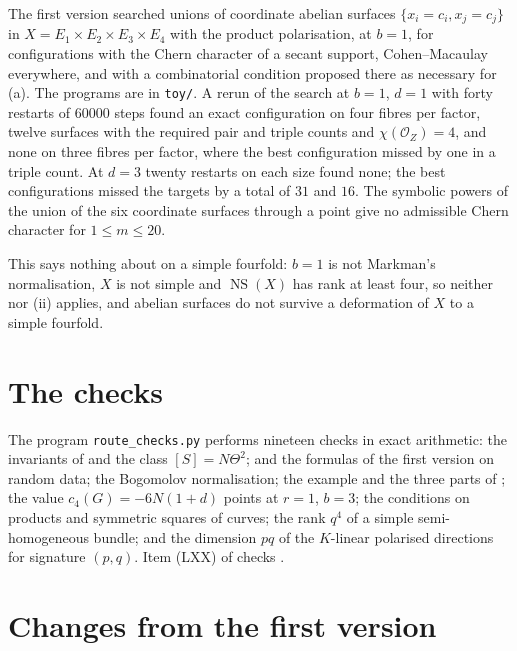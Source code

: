 \documentclass[11pt]{amsart}
\theoremstyle{definition}
\theoremstyle{remark}
\newcommand{\cO}{\mathcal{O}}
\newcommand{\NS}{\operatorname{NS}}
\begin{document}
The first version searched unions of coordinate abelian surfaces
$\{x_{i}=c_{i},x_{j}=c_{j}\}$ in $X=E_{1}\times E_{2}\times E_{3}\times E_{4}$
with the product polarisation, at $b=1$, for configurations with the Chern
character of a secant support, Cohen--Macaulay everywhere, and with a
combinatorial condition proposed there as necessary for (a). The programs are
in \texttt{toy/}. A rerun of the search at $b=1$, $d=1$ with forty restarts
of $60000$ steps found an exact configuration on four fibres per factor,
twelve surfaces with the required pair and triple counts and
$\chi(\cO_{Z})=4$, and none on three fibres per factor, where the best
configuration missed by one in a triple count. At $d=3$ twenty restarts on
each size found none; the best configurations missed the targets by a total
of $31$ and $16$. The
symbolic powers of the union of the six coordinate surfaces through a point
give no admissible Chern character for $1\le m\le20$.

This says nothing about  on a simple fourfold: $b=1$ is
not Markman's normalisation, $X$ is not simple and $\NS(X)$ has rank at
least four, so neither \cite[Lemma~18.43]{BMB} nor (ii)
applies, and abelian surfaces do not survive a deformation of $X$ to a
simple fourfold.

\section{The checks}\label{sec:checks}

The program \texttt{route\_checks.py} performs nineteen checks in exact
arithmetic: the invariants of  and the class
$[S]=N\Theta^{2}$;  and the formulas of the first version
on random data; the Bogomolov normalisation; the example and the three parts
of ; the value $c_{4}(G)=-6N(1+d)$ points at $r=1$,
$b=3$; the conditions on products and symmetric squares of curves; the rank
$q^{4}$ of a simple semi-homogeneous bundle; and the dimension $pq$ of the
$K$-linear polarised directions for signature $(p,q)$. Item (LXX) of
\cite[Appendix~D]{BMB} checks .

\section{Changes from the first version}\label{sec:changes}
\end{document}
